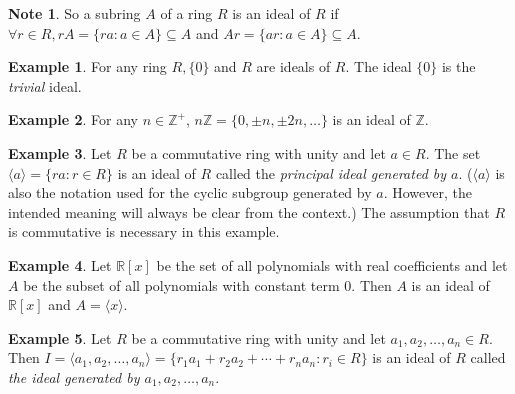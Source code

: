 \documentclass{article}
\newtheorem{theorem}{Theorem}[section]
\theoremstyle{definition}
\newtheorem{example}{Example}[section]
\newtheorem{note}{Note}[section]
\begin{document}
\begin{note}
    So a subring $A$ of a ring $R$ is an ideal of $R$ if $\forall r \in R, rA=\{ra:a\in A\}\subseteq A$ and $Ar=\{ar:a\in A\}\subseteq A$.
\end{note}

\noindent{}

\begin{example}
    For any ring $R, \{0\}$ and $R$ are ideals of $R$. The ideal $\{0\}$ is the \textit{trivial} ideal.
\end{example}

\begin{example}
    For any $n\in\mathbb{Z}^+$, $n\mathbb{Z}=\{0,\pm n, \pm 2n, \dots\}$ is an ideal of $\mathbb{Z}$.
\end{example}

\begin{example}
    Let $R$ be a commutative ring with unity and let $a\in R$. The set $\langle a \rangle=\{ra:r\in R\}$ is an ideal of $R$ called the \textit{principal ideal generated by $a$}. ($\langle a \rangle$ is also the notation used for the cyclic subgroup generated by $a$. However, the intended meaning will always be clear from the context.) The assumption that $R$ is commutative is necessary in this example. 
\end{example}

\begin{example}
    Let $\mathbb{R}[x]$ be the set of all polynomials with real coefficients and let $A$ be the subset of all polynomials with constant term 0. Then $A$ is an ideal of $\mathbb{R}[x]$ and $A=\langle x \rangle$.
\end{example}

\begin{example}
    Let $R$ be a commutative ring with unity and let $a_1,a_2,\dots,a_n \in R$. Then $I=\langle a_1,a_2,\dots,a_n\rangle=\{r_1a_1+r_2a_2+\cdots+r_na_n:r_i\in R\}$ is an ideal of $R$ called \textit{the ideal generated by $a_1,a_2,\dots,a_n$}. 
\end{example}
\end{document}
